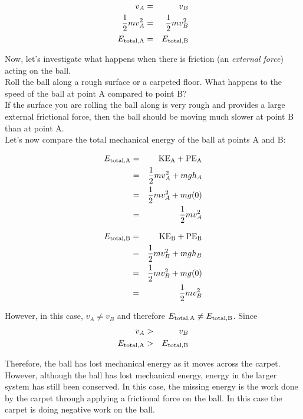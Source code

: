 {\begin{eqnarray*}
v_{A} & = & v_{B}\\
\frac{1}{2}mv_{A}^{2} & = & \frac{1}{2}mv_{B}^{2}\\
E_{\rm{total,A}}  & = & E_{\rm{total,B}} 
\end{eqnarray*}

Now, let's investigate what happens when there is friction (an \textit{external force}) acting on the ball.\\
Roll the ball along a rough surface or a carpeted floor. What happens to the speed of the ball at point A compared to point B? \\
If the surface you are rolling the ball along is very rough and provides a large external frictional force, then the ball should be moving much slower at point B than at point A. \\
Let's now compare the total mechanical energy of the ball at points A and B: \\

\begin{minipage}{.49\textwidth}
\begin{eqnarray*}
E_{\rm{total,A}}  & = & \rm{KE}_{A} + \rm{PE}_{A}  \\
& = & \frac{1}{2}mv_{A}^{2} + mgh_{A} \\
& = & \frac{1}{2}mv_{A}^{2} + mg(0) \\
& = & \frac{1}{2}mv_{A}^{2} 
\end{eqnarray*}
\end{minipage}
\begin{minipage}{.49\textwidth}
\begin{eqnarray*}
E_{\rm{total,B}}  & = & \rm{KE}_{B} + \rm{PE}_{B}  \\
& = & \frac{1}{2}mv_{B}^{2} + mgh_{B} \\
& = & \frac{1}{2}mv_{B}^{2} + mg(0) \\
& = & \frac{1}{2}mv_{B}^{2} 
\end{eqnarray*}
\end{minipage}

However, in this case, $v_{A} \neq v_{B}$ and therefore $E_{\rm{total,A}}  \neq E_{\rm{total,B}} $. Since 
\begin{eqnarray*}
v_{A} & > & v_{B} \\
E_{\rm{total,A}}  & > &  E_{\rm{total,B}}
\end{eqnarray*}

Therefore, the ball has lost mechanical energy as it moves across the carpet. 
However, although the ball has lost mechanical energy, energy in the larger system has still been conserved. In this case, the missing
energy is the work done by the carpet through applying a frictional force on the ball. In this case the carpet is doing negative work on the ball. 
}

